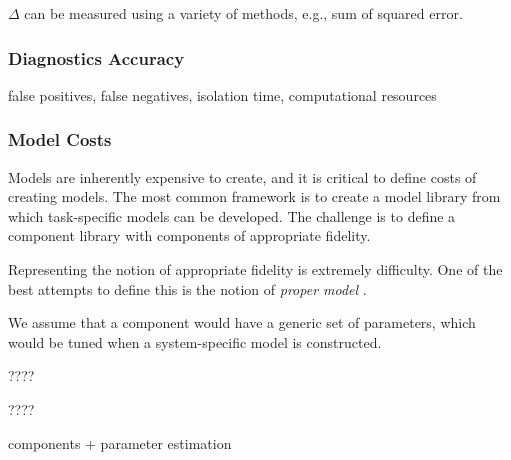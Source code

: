 $\Delta$ can be measured using a variety of methods, e.g., sum of squared error.

\subsubsection{Diagnostics Accuracy}


false positives, false negatives, isolation time, computational resources



\subsubsection{Model Costs}

Models are inherently expensive to create, and it is critical to define costs of creating models. The most common  framework is to create a model library from which task-specific models can be developed. The challenge is to define a component library with components of appropriate fidelity. 

Representing the notion of appropriate fidelity is extremely difficulty. One of the best attempts to define this is the notion of \textit{proper model} \cite{??}.


We assume that a component would have a generic set of parameters, which would be tuned when a system-specific model is constructed.


\begin{definition}
????
\end{definition}

\begin{definition}
????

components + parameter estimation

\end{definition}













